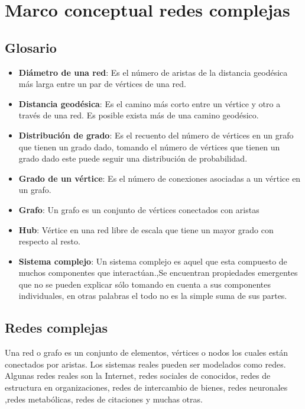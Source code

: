 \section{Marco conceptual redes complejas}

\subsection{Glosario}
\begin{itemize}
    \item \textbf{Diámetro de una red}\cite{RosenDiscrete}: Es el número de aristas de la distancia geodésica más larga
    entre un par de vértices de una red.
    \item \textbf{Distancia geodésica}\cite{RosenDiscrete}: Es el camino más corto entre un vértice y otro a través de una red. Es posible exista más de una camino geodésico.
    \item \textbf{Distribución de grado}\cite{BarabasiNetwork}: Es el recuento del número de vértices en un grafo que tienen un grado dado, tomando el número de vértices que tienen un grado dado este puede seguir una distribución de probabilidad.
    \item \textbf{Grado de un vértice}\cite{RosenDiscrete}: Es el número de conexiones asociadas a un vértice en un grafo.
    \item \textbf{Grafo}: Un grafo es un conjunto de vértices conectados con aristas
    \item \textbf{Hub}\cite{BarabasiNetwork}: Vértice en una red libre de escala que tiene un mayor grado con respecto al resto.
    \item \textbf{Sistema complejo}\cite{BarabasiNetwork}: Un sistema complejo es aquel que esta compuesto de muchos componentes que interactúan.,Se encuentran propiedades emergentes que no se pueden explicar sólo tomando en cuenta a sus componentes individuales, en otras palabras el todo no es la simple suma de sus partes.
\end{itemize}


\subsection{Redes complejas}

Una red o grafo\cite{Newman2003}
es un conjunto de elementos, vértices o nodos los cuales están conectados por aristas. Los sistemas reales pueden ser modelados como redes. Algunas redes reales son la Internet, redes sociales de conocidos, redes de estructura en organizaciones, redes de intercambio de bienes, redes neuronales ,redes metabólicas, redes de citaciones y muchas otras.

